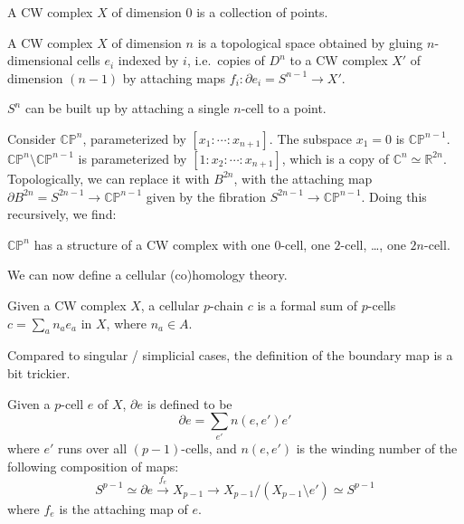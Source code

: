 \documentclass[12pt]{article}
\numberwithin{equation}{section}
\theoremstyle{remark}
\def\bC{\mathbb{C}}
\def\bR{\mathbb{R}}
\def\CP{\mathbb{CP}}
\begin{document}
\begin{definition}
  A CW complex $X$ of dimension $0$ is a collection of points.
\end{definition}

\begin{definition}
A CW complex $X$ of dimension $n$ is a topological space obtained by 
gluing $n$-dimensional cells $e_i$ indexed by $i$, 
i.e.~copies of $D^n$
to a CW complex $X'$ of dimension $(n-1)$ by 
attaching maps $f_i:\partial e_i = S^{n-1}\to X'$.
\end{definition}

\begin{example}
$S^n$ can be built up by attaching a single $n$-cell to a point.
\end{example}

Consider $\CP^n$, parameterized by $[x_1:\cdots:x_{n+1}]$.
The subspace $x_1=0$ is $\CP^{n-1}$.
$\CP^n \setminus \CP^{n-1}$ is parameterized by $[1:x_2:\cdots:x_{n+1}]$,
which is a copy of $\bC^n\simeq \bR^{2n}$.
Topologically, we can replace it with $B^{2n}$, 
with the attaching map $\partial B^{2n}=S^{2n-1}\to \CP^{n-1}$ given by 
the fibration $S^{2n-1}\to \CP^{n-1}$.
Doing this recursively, we find:
\begin{example}
$\CP^n$ has a structure of a CW complex with one $0$-cell, 
one $2$-cell, \ldots, one $2n$-cell.
\end{example}

We can now define a cellular (co)homology theory.

\begin{definition}
Given a CW complex $X$,
a cellular $p$-chain $c$ is a formal sum of $p$-cells $c=\sum_a n_a e_a$ in $X$, where $n_a\in A$.
\end{definition}

Compared to singular / simplicial cases, the definition of the boundary map is a bit trickier. 
\begin{definition}
Given a $p$-cell $e$ of $X$, $\partial e$ is defined to be \begin{equation}
\partial e = \sum_{e'} n(e,e') e'
\end{equation} where $e'$ runs over all $(p-1)$-cells, and $n(e,e')$ is 
the winding number of the following composition of maps: \begin{equation}
S^{p-1}\simeq  \partial e \xrightarrow{f_e} X_{p-1} \to X_{p-1}/(X_{p-1}\setminus e') \simeq S^{p-1}
\end{equation}
where $f_e$ is the attaching map of $e$.
\end{definition}
\end{document}
